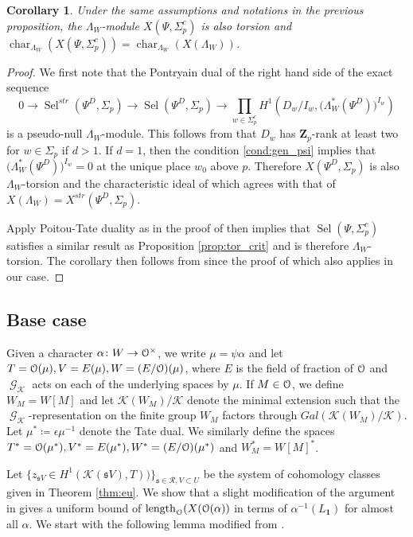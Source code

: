 \documentclass[leqno]{amsart}
\newtheorem{cor}[thm]{Corollary}
\theoremstyle{definition}
\theoremstyle{remark}
\newcommand{\id}{\mathbf{1}}
\newcommand{\eo}{\EuScript{O}}
\newcommand{\Zp}{\mathbf{Z}_p}
\DeclareMathOperator{\length}{length}
\DeclareMathOperator{\Gal}{\mathcal{G}}
\newcommand{\fs}{\mathfrak{s}}
\newcommand{\K}{{\mathcal{K}}} %
\DeclareMathOperator{\Sel}{Sel}
\DeclareMathOperator{\car}{char}
\begin{document}
\begin{cor}\label{cor:main}
Under the same assumptions and notations
in the previous proposition, 
the $\Lambda_W$-module $X(\Psi, \Sigma_p^c)$
is also torsion and 
$\car_{\Lambda_W}(X(\Psi,\Sigma_p^c))=\car_{\Lambda_W}(X(\Lambda_W))$.
\end{cor}
\begin{proof}
    We first note that 
    the Pontryain dual of the right hand side of the exact sequence
    \[
    0\to \Sel^{str}(\Psi^D,\Sigma_p)\to 
    \Sel(\Psi^D,\Sigma_p)\to 
    \prod_{w\in \Sigma_p^c}
    H^1(D_w/I_w, \big(\Lambda_W^*(\Psi^D)\big)^{I_w})
    \]
    is a pseudo-null $\Lambda_W$-module.
    This follows from that $D_w$ has $\Zp$-rank at least two
    for $w\in\Sigma_p$ if $d>1$.
    If $d=1$, then the condition \eqref{cond:gen_psi} implies
    that $\big(\Lambda_W^*(\Psi^D)\big)^{I_w}=0$
    at the unique place $w_0$ above $p$.
    Therefore 
    $X(\Psi^D,\Sigma_p)$ is also $\Lambda_W$-torsion
    and the characteristic ideal of which agrees with 
    that of $X(\Lambda_W)=X^{str}(\Psi^D, \Sigma_p)$.

    Apply Poitou-Tate duality as in the proof of
    \cite[Prop 2.6]{Hsieh2010} then implies that 
    $\Sel(\Psi,\Sigma_p^c)$ satisfies a similar 
    result as Proposition \ref{prop:tor_crit}
    and is therefore $\Lambda_W$-torsion.
    The corollary then follows from 
    \cite[Thm 2.8]{Hsieh2010}
    since the proof of which also applies in our case.

    
\end{proof}



\subsection{Base case}

Given a character $\alpha\colon W\to \eo^\times$,
we write $\mu=\psi\alpha$ and let 
$T=\eo(\mu), V=E(\mu), W=(E/\eo)(\mu)$,
where $E$ is the field of fraction of $\eo$ and
$\Gal_\K$ acts on each of the underlying spaces by $\mu$.
If $M\in\eo$, we define $W_M=W[M]$ and let $\K(W_M)/\K$ 
denote the minimal extension such that
the $\Gal_\K$-representation on the finite group $W_M$
factors through $Gal(\K(W_M)/\K)$.
Let $\mu^*\coloneqq \epsilon\mu^{-1}$ denote the Tate dual.
We similarly define the spaces
$T^*=\eo(\mu^*), V^*=E(\mu^*), W^*=(E/\eo)(\mu^*)$ and 
$W_M^*=W[M]^*$.

Let $\{z_{\fs V}\in H^1(\K(\fs V), T))\}_{\fs\in\mathcal{R}, V\subset U}$
be the system of cohomology classes
given in Theorem \ref{thm:eu}.
We show that a slight modification of 
the argument in \cite{Rubin} 
gives a uniform bound of
$\length_{\eo}(X(\eo(\alpha))$
in terms of $\alpha^{-1}(L_\id)$ for almost all $\alpha$.
We start with the following lemma 
modified from \cite[Lem 4.1.3]{Rubin}.
\end{document}
